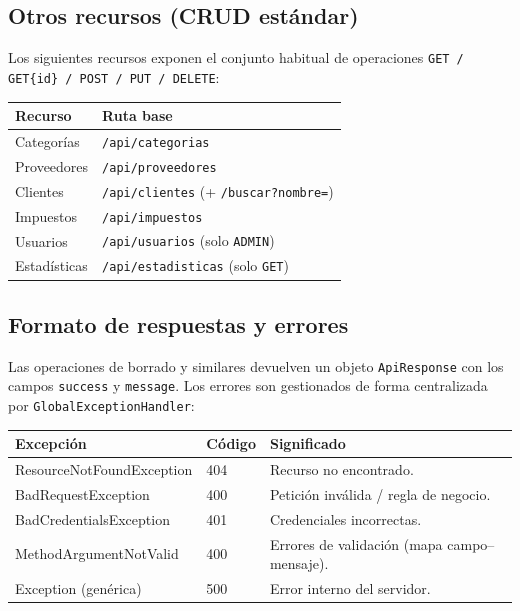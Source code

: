 \documentclass[11pt,a4paper]{article}
\begin{document}
\subsection{Otros recursos (CRUD estándar)}
Los siguientes recursos exponen el conjunto habitual de operaciones
\texttt{GET / GET\{id\} / POST / PUT / DELETE}:

\begin{longtable}{p{4cm} p{10cm}}
\toprule
\textbf{Recurso} & \textbf{Ruta base} \\
\midrule
\endhead
Categorías & \texttt{/api/categorias} \\
Proveedores & \texttt{/api/proveedores} \\
Clientes & \texttt{/api/clientes} (+ \texttt{/buscar?nombre=}) \\
Impuestos & \texttt{/api/impuestos} \\
Usuarios & \texttt{/api/usuarios} (solo \texttt{ADMIN}) \\
Estadísticas & \texttt{/api/estadisticas} (solo \texttt{GET}) \\
\bottomrule
\end{longtable}

\subsection{Formato de respuestas y errores}

Las operaciones de borrado y similares devuelven un objeto \texttt{ApiResponse}
con los campos \texttt{success} y \texttt{message}. Los errores son gestionados
de forma centralizada por \texttt{GlobalExceptionHandler}:

\begin{longtable}{>{\ttfamily}p{6cm} p{2.5cm} p{5cm}}
\toprule
\textbf{\normalfont Excepción} & \textbf{\normalfont Código} & \textbf{\normalfont Significado} \\
\midrule
\endhead
ResourceNotFoundException & 404 & Recurso no encontrado. \\
BadRequestException & 400 & Petición inválida / regla de negocio. \\
BadCredentialsException & 401 & Credenciales incorrectas. \\
MethodArgumentNotValid & 400 & Errores de validación (mapa campo--mensaje). \\
Exception (genérica) & 500 & Error interno del servidor. \\
\bottomrule
\end{longtable}
\end{document}
